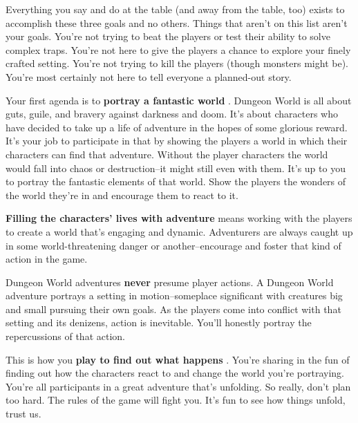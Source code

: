  Everything you say and do at the table (and away from the table, too) exists to accomplish these three goals and no others. Things that aren't on this list aren't your goals. You're not trying to beat the players or test their ability to solve complex traps. You're not here to give the players a chance to explore your finely crafted setting. You're not trying to kill the players (though monsters might be). You're most certainly not here to tell everyone a planned-out story.


 Your first agenda is to \textbf{portray a fantastic world}
. Dungeon World is all about guts, guile, and bravery against darkness and doom. It's about characters who have decided to take up a life of adventure in the hopes of some glorious reward. It's your job to participate in that by showing the players a world in which their characters can find that adventure. Without the player characters the world would fall into chaos or destruction--it might still even with them. It's up to you to portray the fantastic elements of that world. Show the players the wonders of the world they're in and encourage them to react to it.


 \textbf{Filling the characters' lives with adventure}
 means working with the players to create a world that's engaging and dynamic. Adventurers are always caught up in some world-threatening danger or another--encourage and foster that kind of action in the game.


 Dungeon World adventures \textbf{never}
 presume player actions. A Dungeon World adventure portrays a setting in motion--someplace significant with creatures big and small pursuing their own goals. As the players come into conflict with that setting and its denizens, action is inevitable. You'll honestly portray the repercussions of that action.


 This is how you \textbf{play to find out what happens}
. You're sharing in the fun of finding out how the characters react to and change the world you're portraying. You're all participants in a great adventure that's unfolding. So really, don't plan too hard. The rules of the game will fight you. It's fun to see how things unfold, trust us.


 
